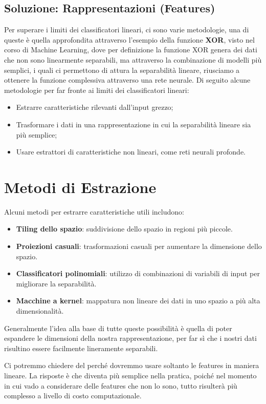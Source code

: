 \subsection{Soluzione: Rappresentazioni (Features)}
Per superare i limiti dei classificatori lineari, ci sono varie metodologie, una di queste è quella approfondita attraverso l'esempio della funzione \textbf{XOR}, visto nel corso di Machine Learning, dove per definizione la funzione XOR genera dei dati che non sono linearmente separabili, ma attraverso la combinazione di modelli più semplici, i quali ci permettono di attura la separabilità lineare, riusciamo a ottenere la funzione complessiva attraverso una rete neurale. Di seguito alcune metodologie per far fronte ai limiti dei classificatori lineari:
\begin{itemize}
    \item Estrarre caratteristiche rilevanti dall'input grezzo;
    \item Trasformare i dati in una rappresentazione in cui la separabilità lineare sia più semplice;
    \item Usare estrattori di caratteristiche non lineari, come reti neurali profonde.
\end{itemize}

\section{Metodi di Estrazione}
Alcuni metodi per estrarre caratteristiche utili includono:
\begin{itemize}
    \item \textbf{Tiling dello spazio}: suddivisione dello spazio in regioni più piccole.
    \item \textbf{Proiezioni casuali}: trasformazioni casuali per aumentare la dimensione dello spazio.
    \item \textbf{Classificatori polinomiali}: utilizzo di combinazioni di variabili di input per migliorare la separabilità.
    \item \textbf{Macchine a kernel}: mappatura non lineare dei dati in uno spazio a più alta dimensionalità.
\end{itemize}

Generalmente l'idea alla base di tutte queste possibilità è quella di poter espandere le dimensioni della nostra rappresentazione, per far sì che i nostri dati risultino essere facilmente lineramente separabili.

\begin{Osservazione}
    Ci potremmo chiedere del perché dovremmo usare soltanto le features in maniera lineare. La risposte è che diventa più semplice nella pratica, poiché nel momento in cui vado a considerare delle features che non lo sono, tutto risulterà più complesso a livello di costo computazionale.
\end{Osservazione}

